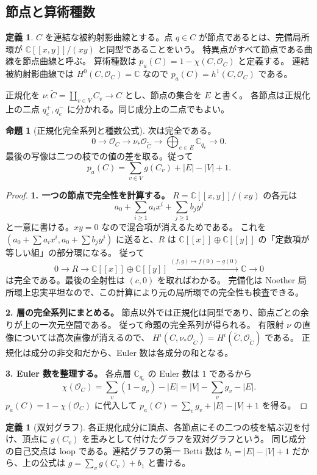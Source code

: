 \documentclass[dvipdfmx,a4paper,11pt]{article}
\theoremstyle{definition}
\newtheorem{prop}[thm]{命題}
\newtheorem{dfn}[thm]{定義}
\newcommand{\C}{\mathbb C}\newcommand{\R}{\mathbb R}\newcommand{\Z}{\mathbb Z}\newcommand{\Q}{\mathbb Q}
\newcommand{\OO}{\mathcal O}\newcommand{\MM}{\mathcal M}\newcommand{\TT}{\mathcal T}
\begin{document}
\subsection{節点と算術種数}
\begin{dfn}
$C$ を連結な被約射影曲線とする。点 $q\in C$ が節点であるとは、完備局所環が $\C[[x,y]]/(xy)$ と同型であることをいう。
特異点がすべて節点である曲線を節点曲線と呼ぶ。
算術種数は $p_a(C)=1-\chi(C,\OO_C)$ と定義する。
連結被約射影曲線では $H^0(C,\OO_C)=\C$ なので $p_a(C)=h^1(C,\OO_C)$ である。
\end{dfn}
正規化を $\nu:\widetilde C=\coprod_{v\in V}C_v\to C$ とし、節点の集合を $E$ と書く。
各節点は正規化上の二点 $q_e^+,q_e^-$ に分かれる。同じ成分上の二点でもよい。
\begin{prop}[正規化完全系列と種数公式]\label{prop:genusgraph}
次は完全である。
\[
0\to\OO_C\to\nu_*\OO_{\widetilde C}\to\bigoplus_{e\in E}\C_{q_e}\to0.
\]
最後の写像は二つの枝での値の差を取る。従って
\[
p_a(C)=\sum_{v\in V}g(C_v)+|E|-|V|+1.
\]
\end{prop}
\begin{proof}
\textbf{1. 一つの節点で完全性を計算する。}
$R=\C[[x,y]]/(xy)$ の各元は
\[
a_0+\sum_{i\ge1}a_ix^i+\sum_{j\ge1}b_jy^j
\]
と一意に書ける。$xy=0$ なので混合項が消えるためである。
これを $(a_0+\sum a_ix^i,a_0+\sum b_jy^j)$ に送ると、$R$ は
$\C[[x]]\oplus\C[[y]]$ の「定数項が等しい組」の部分環になる。
従って
\[
0\to R\to\C[[x]]\oplus\C[[y]]
\xrightarrow{(f,g)\mapsto f(0)-g(0)}\C\to0
\]
は完全である。最後の全射性は $(c,0)$ を取ればわかる。
完備化は Noether 局所環上忠実平坦なので、この計算により元の局所環での完全性も検査できる。

\textbf{2. 層の完全系列にまとめる。}
節点以外では正規化は同型であり、節点ごとの余りが上の一次元空間である。
従って命題の完全系列が得られる。
有限射 $\nu$ の直像については高次直像が消えるので、
$H^i(C,\nu_*\OO_{\widetilde C})=H^i(\widetilde C,\OO_{\widetilde C})$ である。
正規化は成分の非交和だから、Euler 数は各成分の和となる。

\textbf{3. Euler 数を整理する。}
各点層 $\C_{q_e}$ の Euler 数は $1$ であるから
\[
\chi(\OO_C)=\sum_v(1-g_v)-|E|
=|V|-\sum_v g_v-|E|.
\]
$p_a(C)=1-\chi(\OO_C)$ に代入して
$p_a(C)=\sum_v g_v+|E|-|V|+1$ を得る。
\end{proof}
\begin{dfn}[双対グラフ]
各正規化成分に頂点、各節点にその二つの枝を結ぶ辺を付け、頂点に $g(C_v)$ を重みとして付けたグラフを双対グラフという。
同じ成分の自己交点は loop である。連結グラフの第一 Betti 数は $b_1=|E|-|V|+1$ だから、上の公式は $g=\sum_vg(C_v)+b_1$ と書ける。
\end{dfn}
\end{document}
